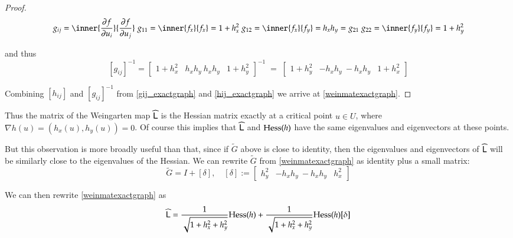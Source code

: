\begin{proof}
	 
	 
	 \begin{equation}
	 \begin{gathered}
	 g_{ij} = \inner{\frac{\partial f}{\partial u_i}}{\frac{\partial f}{\partial u_j}} \
	 g_{11} = \inner{f_x}{f_x} = 1 + h_x^2 \
	 g_{12} = \inner{f_x}{f_y} = h_x h_y = g_{21} \
	 g_{22} = \inner{f_y}{f_y} = 1 + h_y^2
	 \end{gathered}
	 \end{equation}
	 
	 and thus
		\begin{equation} \label{gij_exactgraph}		 
		[g_{ij}]^{-1} = \begin{bmatrix} 1 + h_x^2 & h_x h_y \
					h_x h_y & 1 + h_y^2 \end{bmatrix}^{-1}
					\;=\;	\begin{bmatrix} 1 + h_y^2 & -h_x h_y \
					-	h_x h_y & 1 + h_x^2 \end{bmatrix}
		\end{equation}
       	
       	Combining $[h_{ij}]$ and $[g_{ij}]^{-1}$ from \cref{gij_exactgraph} and \cref{hij_exactgraph}
       	we arrive at \cref{weinmatexactgraph}.
       	\end{proof}
       	
  Thus the matrix of the Weingarten map $\widehat{\mathsf{L}}$ is the Hessian matrix exactly at a critical point $u \in  U$, where $\nabla h(u) = (h_x(u), h_y(u)) = 0$. Of course this implies that $\widehat{\mathsf{L}}$ and $\mathrm{Hess}{(h)}$ have the same eigenvalues and eigenvectors at these points.
  
But this observation is more broadly useful than that, since if $\tilde{G}$ above is close to identity, then the eigenvalues and eigenvectors of $\widehat{\mathsf{L}}$ will be similarly close to the eigenvalues of the Hessian. We can rewrite $\tilde{G}$ from \cref{weinmatexactgraph} as identity plus a small matrix:
\begin{equation}
\tilde{G} = I + [\delta], \quad  [\delta] := \begin{bmatrix} h_y^2 & -h_x h_y \ -h_x h_y & h_x^2 \end{bmatrix}
\end{equation}

We can then rewrite \cref{weinmatexactgraph} as 
\begin{equation}
\widehat{\mathsf{L}} = \frac{1}{\sqrt{1+h_x^2 + h_y^2}} \mathrm{Hess}(h)
+ \frac{1}{\sqrt{1+h_x^2 + h_y^2}} \mathrm{Hess}(h) [\delta]
\end{equation}

